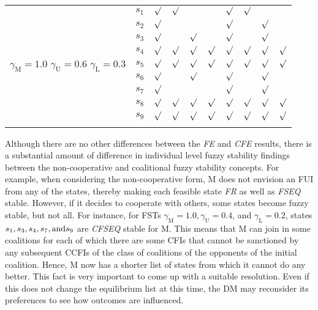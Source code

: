 \begin{table}[!h]
\begin{tabular}{c|c!{\vrule width 1.3pt}x{12mm}|x{12mm}|x{12mm}|x{12mm}!{\vrule width 1.3pt}x{12mm}|x{12mm}|x{12mm}|x{12mm}}

 &$s_1$&$\surd$&$\surd$&       &       &$\surd$&$\surd$&       &        \\
 &$s_2$&$\surd$&       &       &       &$\surd$&       &$\surd$&        \\
 &$s_3$&$\surd$&       &$\surd$&       &$\surd$&       &$\surd$&        \\
 &$s_4$&$\surd$&$\surd$&$\surd$&$\surd$&$\surd$&$\surd$&$\surd$&$\surd$ \\
 &$s_5$&$\surd$&$\surd$&$\surd$&$\surd$&$\surd$&$\surd$&$\surd$&$\surd$ \\
 &$s_6$&$\surd$&       &$\surd$&       &$\surd$&       &$\surd$&        \\
 &$s_7$&$\surd$&       &       &       &$\surd$&       &$\surd$&        \\
 &$s_8$&$\surd$&$\surd$&$\surd$&$\surd$&$\surd$&$\surd$&$\surd$&$\surd$ \\
 &$s_9$&$\surd$&$\surd$&$\surd$&$\surd$&$\surd$&$\surd$&$\surd$&$\surd$ \\[1mm]

\end{tabular}
\label{fsr-tbl-fr-fseq}
\end{table}

Although there are no other differences between the \emph{FE} and \emph{CFE} results, there is a substantial amount of difference in individual level fuzzy stability findings between the non-cooperative and coalitional fuzzy stability concepts. For example, when considering the non-cooperative form, M does not envision an FUI from any of the states, thereby making each feasible state \emph{FR} as well as \emph{FSEQ} stable. However, if it decides to cooperate with others, some states become fuzzy stable, but not all. For instance, for FSTs $\gamma_\text{M}=1.0, \gamma_\text{U}=0.4$, and $\gamma_\text{L}=0.2$, states $s_1, s_3, s_4, s_7, {\rm and} s_9$ are \emph{CFSEQ} stable for M. This means that M can join in some coalitions for each of which there are some CFIs that cannot be sanctioned by any subsequent CCFIs of the class of coalitions of the opponents of the initial coalition. Hence, M now has a shorter list of states from which it cannot do any better. This fact is very important to come up with a suitable resolution. Even if this does not change the equilibrium list at this time, the DM may reconsider its preferences to see how outcomes are influenced.

